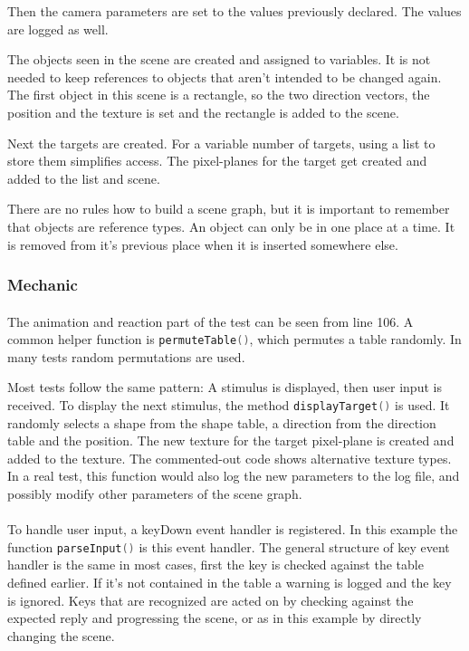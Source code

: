 Then the camera parameters are set to the values previously declared.
The values are logged as well.

The objects seen in the scene are created and assigned to variables.
It is not needed to keep references to objects that aren't intended to be changed again.
The first object in this scene is a rectangle, so the two direction vectors, the position and the texture is set and the rectangle is added to the scene.

Next the targets are created.
For a variable number of targets, using a list to store them simplifies access.
The pixel-planes for the target get created and added to the list and scene.

There are no rules how to build a scene graph, but it is important to remember that objects are reference types.
An object can only be in one place at a time.
It is removed from it's previous place when it is inserted somewhere else.

\subsubsection{Mechanic}
\paragraph{}
The animation and reaction part of the test can be seen from line 106.
A common helper function is \lstinline[language=lua]{permuteTable()}, which permutes a table randomly.
In many tests random permutations are used.

Most tests follow the same pattern: A stimulus is displayed, then user input is received.
To display the next stimulus, the method \lstinline[language=lua]{displayTarget()} is used.
It randomly selects a shape from the shape table, a direction from the direction table and the position.
The new texture for the target pixel-plane is created and added to the texture.
The commented-out code shows alternative texture types.
In a real test, this function would also log the new parameters to the log file, and possibly modify other parameters of the scene graph.

\paragraph{}
To handle user input, a keyDown event handler is registered.
In this example the function \lstinline[language=lua]{parseInput()} is this event handler.
The general structure of key event handler is the same in most cases, first the key is checked against the table defined earlier.
If it's not contained in the table a warning is logged and the key is ignored.
Keys that are recognized are acted on by checking against the expected reply and progressing the scene, or as in this example by directly changing the scene.

